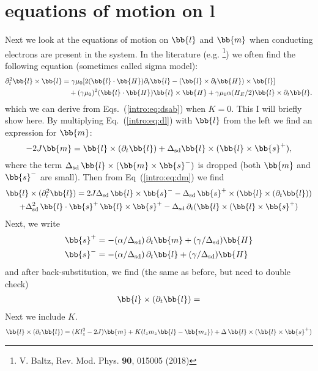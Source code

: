 \section{equations of motion on \textbf{l}}
Next we look at the equations of motion on $\bb{l}$ and $\bb{m}$ when conducting electrons are present in the system. In the literature (e.g. \footnote{V. Baltz, Rev. Mod. Phys. \textbf{90}, 015005 (2018)}) we often find the following equation (sometimes called sigma model):
\begin{align}
    \partial_t^2 \bb{l}\times\bb{l} &= \gamma\mu_0[2(\bb{l}\cdot\bb{H})\partial_t \bb{l}-(\bb{l}\times\partial_t\bb{H})\times\bb{l}]\nonumber\\
    &\quad+(\gamma\mu_0)^2(\bb{l}\cdot\bb{H})\bb{l}\times\bb{H}+\gamma\mu_0\alpha(H_E/2)\bb{l}\times\partial_t\bb{l}.
\end{align}
which we can derive from Eqs.~(\ref{intro:eq:dsab}) when $K=0$. This I will briefly show here. By multiplying Eq.~(\ref{intro:eq:dl}) with $\bb{l}$ from the left we find an expression for $\bb{m}$:
\begin{equation}
     -2J\bb{m} =\bb{l}\times(\partial_t\bb{l}) + \Delta_\text{sd} \bb{l}\times(\bb{l}\times\bb{s}^+),
\end{equation}
where the term $\Delta_\text{sd}\,\bb{l}\times(\bb{m}\times\bb{s}^-)$ is dropped (both $\bb{m}$ and $\bb{s}^-$ are small). Then from Eq~(\ref{intro:eq:dm}) we find
\begin{multline}
    \bb{l}\times(\partial_t^2\bb{l})=
    2J\Delta_\text{sd}\,\bb{l}\times\bb{s}^--\Delta_\text{sd} \,\bb{s}^+\times(\bb{l}\times (\partial_t\bb{l}))\\
    +\Delta_\text{sd}^2\,\bb{l}\cdot\bb{s}^+\,\bb{l}\times\bb{s}^+-\Delta_\text{sd}\,\partial_t(\bb{l}\times(\bb{l}\times\bb{s}^+)
\end{multline}
Next, we write
\begin{align}
    \bb{s}^+ &= - (\alpha/\Delta_\text{sd})\,\partial_t \bb{m}+(\gamma/\Delta_\text{sd})\bb{H} \\ 
    \bb{s}^- &= - (\alpha/\Delta_\text{sd})\,\partial_t \bb{l}+(\gamma/\Delta_\text{sd})\bb{H}
\end{align}
and after back-substitution, we find (the same as before, but need to double check)
\begin{multline}
    \bb{l}\times(\partial_t\bb{l}) = 
\end{multline}
Next we include $K$. 
\begin{multline}
    \bb{l}\times(\partial_t\bb{l}) = (Kl_z^2-2J)\bb{m}+K(l_zm_z\bb{l}-\bb{m_z})+\Delta\,\bb{l}\times(\bb{l}\times\bb{s}^+)
    \label{intro:eq:l2}
\end{multline}
